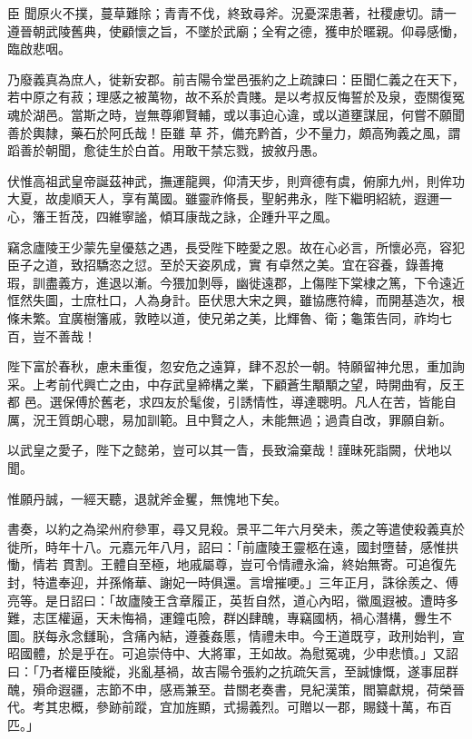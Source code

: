 \begin{pinyinscope}
 臣
 聞原火不撲，蔓草難除；青青不伐，終致尋斧。況憂深患著，社稷慮切。請一遵晉朝武陵舊典，使顧懷之旨，不墜於武廟；全宥之德，獲申於暱親。仰尋感慟，臨啟悲咽。



 乃廢義真為庶人，徙新安郡。前吉陽令堂邑張約之上疏諫曰：臣聞仁義之在天下，若中原之有菽；理感之被萬物，故不系於貴賤。是以考叔反悔誓於及泉，壺關復冤魂於湖邑。當斯之時，豈無尊卿賢輔，或以事迫心違，或以道壅謀屈，何嘗不願聞善於輿隸，藥石於阿氏哉！臣雖
 草
 芥，備充黔首，少不量力，頗高殉義之風，謂蹈善於朝聞，愈徒生於白首。用敢干禁忘戮，披敘丹愚。



 伏惟高祖武皇帝誕茲神武，撫運龍興，仰清天步，則齊德有虞，俯廓九州，則侔功大夏，故虔順天人，享有萬國。雖靈祚脩長，聖躬弗永，陛下繼明紹統，遐邇一心，籓王哲茂，四維寧謐，傾耳康哉之詠，企踵升平之風。



 竊念廬陵王少蒙先皇優慈之遇，長受陛下睦愛之恩。故在心必言，所懷必亮，容犯臣子之道，致招驕恣之愆。至於天姿夙成，實
 有卓然之美。宜在容養，錄善掩瑕，訓盡義方，進退以漸。今猥加剝辱，幽徙遠郡，上傷陛下棠棣之篤，下令遠近恇然失圖，士庶杜口，人為身計。臣伏思大宋之興，雖協應符緯，而開基造次，根條未繁。宜廣樹籓戚，敦睦以道，使兄弟之美，比輝魯、衛；龜策告同，祚均七百，豈不善哉！



 陛下富於春秋，慮未重復，忽安危之遠算，肆不忍於一朝。特願留神允思，重加詢采。上考前代興亡之由，中存武皇締構之業，下顧蒼生顒顒之望，時開曲宥，反王都
 邑。選保傅於舊老，求四友於髦俊，引誘情性，導達聰明。凡人在苦，皆能自厲，況王質朗心聰，易加訓範。且中賢之人，未能無過；過貴自改，罪願自新。



 以武皇之愛子，陛下之懿弟，豈可以其一眚，長致淪棄哉！謹昧死詣闕，伏地以聞。



 惟願丹誠，一經天聽，退就斧金矍，無愧地下矣。



 書奏，以約之為梁州府參軍，尋又見殺。景平二年六月癸未，羨之等遣使殺義真於徙所，時年十八。元嘉元年八月，詔曰：「前廬陵王靈柩在遠，國封墮替，感惟拱慟，情若
 貫割。王體自至極，地戚屬尊，豈可令情禮永淪，終始無寄。可追復先封，特遣奉迎，并孫脩華、謝妃一時俱還。言增摧哽。」三年正月，誅徐羨之、傅亮等。是日詔曰：「故廬陵王含章履正，英哲自然，道心內昭，徽風遐被。遭時多難，志匡權逼，天未悔禍，運鐘屯險，群凶肆醜，專竊國柄，禍心潛構，釁生不圖。朕每永念讎恥，含痛內結，遵養姦慝，情禮未申。今王道既亨，政刑始判，宣昭國體，於是乎在。可追崇侍中、大將軍，王如故。為慰冤魂，少申悲憤。」又詔
 曰：「乃者權臣陵縱，兆亂基禍，故吉陽令張約之抗疏矢言，至誠慷慨，遂事屈群醜，殞命遐疆，志節不申，感焉兼至。昔關老奏書，見紀漢策，閻纂獻規，荷榮晉代。考其忠概，參跡前蹤，宜加旌顯，式揚義烈。可贈以一郡，賜錢十萬，布百匹。」




\end{pinyinscope}
